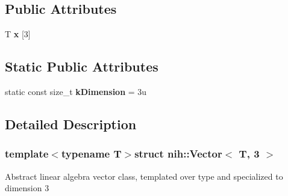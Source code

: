 \subsection*{\-Public \-Attributes}
\begin{DoxyCompactItemize}
\item 
\hypertarget{structnih_1_1_vector_3_01_t_00_013_01_4_ad5d83caaf0ebda0b9605e85fdd8fd8a9}{
\-T {\bfseries x} \mbox{[}3\mbox{]}}
\label{structnih_1_1_vector_3_01_t_00_013_01_4_ad5d83caaf0ebda0b9605e85fdd8fd8a9}

\end{DoxyCompactItemize}
\subsection*{\-Static \-Public \-Attributes}
\begin{DoxyCompactItemize}
\item 
\hypertarget{structnih_1_1_vector_3_01_t_00_013_01_4_a70896fe0323a750c0aabe49c2fbe3532}{
static const size\-\_\-t {\bfseries k\-Dimension} = 3u}
\label{structnih_1_1_vector_3_01_t_00_013_01_4_a70896fe0323a750c0aabe49c2fbe3532}

\end{DoxyCompactItemize}


\subsection{\-Detailed \-Description}
\subsubsection*{template$<$typename T$>$struct nih\-::\-Vector$<$ T, 3 $>$}

\-Abstract linear algebra vector class, templated over type and specialized to dimension 3 

